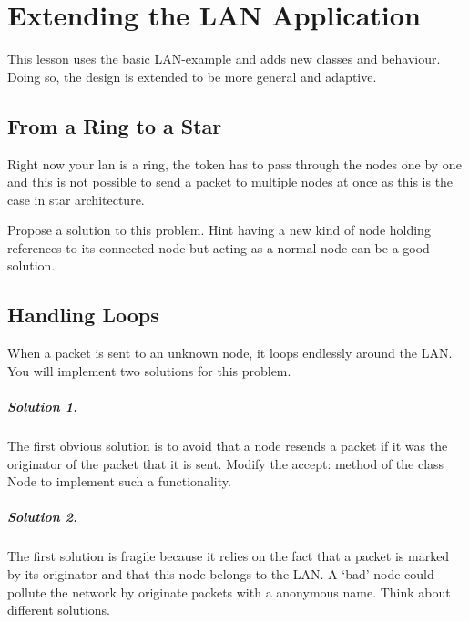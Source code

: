 
\ifx\wholebook\relax\else


\fi

\chapter{ Extending the LAN Application}

This lesson uses the basic LAN-example and adds new classes and 
behaviour. Doing so, the design is extended to be more general 
and adaptive.




\section{From a Ring to a Star}
Right now your lan is a ring, the token has to pass through the nodes one by one and this is not possible to send a packet to multiple nodes at once as this is the case in star architecture. 

\exercise Propose a solution to this problem. Hint having a new kind of node holding references to its connected node but acting as a normal node can be a good solution.




\section{Handling Loops}
When a packet is sent to an unknown node, it loops endlessly 
around the LAN. You will implement two solutions for this problem. 

\paragraph{Solution 1.} The first obvious solution is to avoid that a node 
resends a packet if it was the originator of the packet that 
it is sent. Modify the accept: method of the class Node to implement 
such a functionality. 

\paragraph{Solution 2.} The first solution is fragile because it relies on 
the fact that a packet is marked by its originator and that this 
node belongs to the LAN. A `bad' node could pollute the network 
by originate packets with a anonymous name. Think about different 
solutions.

